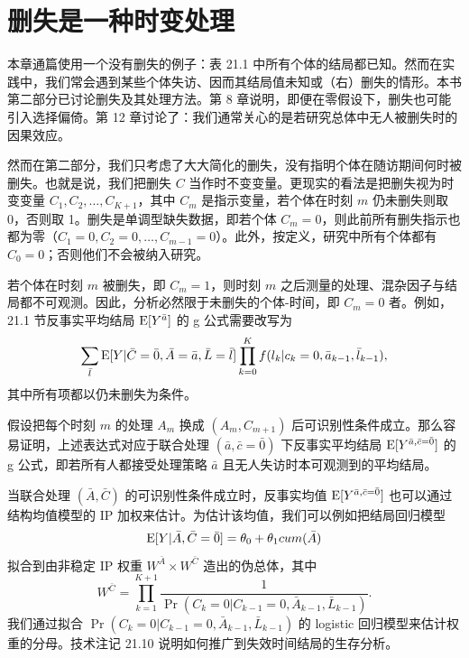 \section{删失是一种时变处理}

本章通篇使用一个没有删失的例子：表 21.1 中所有个体的结局都已知。然而在实践中，我们常会遇到某些个体失访、因而其结局值未知或（右）删失的情形。本书第二部分已讨论删失及其处理方法。第 8 章说明，即便在零假设下，删失也可能引入选择偏倚。第 12 章讨论了：我们通常关心的是若研究总体中无人被删失时的因果效应。


然而在第二部分，我们只考虑了大大简化的删失，没有指明个体在随访期间何时被删失。也就是说，我们把删失 $C$ 当作时不变变量。更现实的看法是把删失视为时变变量 $C_1,C_2,\dots,C_{K+1}$，其中 $C_m$ 是指示变量，若个体在时刻 $m$ 仍未删失则取 0，否则取 1。删失是单调型缺失数据，即若个体 $C_m=0$，则此前所有删失指示也都为零（$C_1=0,C_2=0,\dots,C_{m-1}=0$）。此外，按定义，研究中所有个体都有 $C_0=0$；否则他们不会被纳入研究。

若个体在时刻 $m$ 被删失，即 $C_m=1$，则时刻 $m$ 之后测量的处理、混杂因子与结局都不可观测。因此，分析必然限于未删失的个体-时间，即 $C_m=0$ 者。例如，21.1 节反事实平均结局 $\mathrm{E}[Y^{\bar a}]$ 的 g 公式需要改写为
\[
\sum_{\bar l}\mathrm{E}[Y|\bar C=\bar 0,\bar A=\bar a,\bar L=\bar l]\prod_{k=0}^{K}f(l_k|c_k=0,\bar a_{k-1},\bar l_{k-1}),
\]
其中所有项都以仍未删失为条件。


假设把每个时刻 $m$ 的处理 $A_m$ 换成 $(A_m,C_{m+1})$ 后可识别性条件成立。那么容易证明，上述表达式对应于联合处理 $(\bar a,\bar c=\bar 0)$ 下反事实平均结局 $\mathrm{E}[Y^{\bar a,\bar c=\bar 0}]$ 的 g 公式，即若所有人都接受处理策略 $\bar a$ 且无人失访时本可观测到的平均结局。


当联合处理 $(\bar A,\bar C)$ 的可识别性条件成立时，反事实均值 $\mathrm{E}[Y^{\bar a,\bar c=\bar 0}]$ 也可以通过结构均值模型的 IP 加权来估计。为估计该均值，我们可以例如把结局回归模型
\[
\mathrm{E}[Y|\bar A,\bar C=\bar 0]=\theta_0+\theta_1cum(\bar A)
\]
拟合到由非稳定 IP 权重 $W^{\bar A}\times W^{\bar C}$ 造出的伪总体，其中
\[
W^{\bar C}=\prod_{k=1}^{K+1}\frac{1}{\Pr(C_k=0|C_{k-1}=0,\bar A_{k-1},\bar L_{k-1})}.
\]
我们通过拟合 $\Pr(C_k=0|C_{k-1}=0,\bar A_{k-1},\bar L_{k-1})$ 的 logistic 回归模型来估计权重的分母。技术注记 21.10 说明如何推广到失效时间结局的生存分析。

